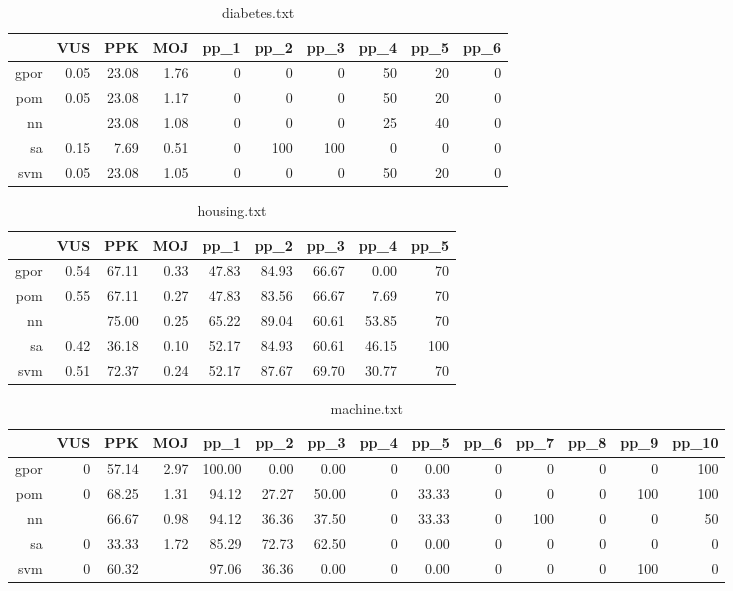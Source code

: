 \documentclass[10pt,a4paper]{article}
\begin{document}
\begin{table}[ht]
\centering
\begin{tabular}{rrrrrrrrrr}
  \hline
 & VUS & PPK & MOJ & pp\_1 & pp\_2 & pp\_3 & pp\_4 & pp\_5 & pp\_6 \\ 
  \hline
gpor & 0.05 & 23.08 & 1.76 &   0 &   0 &   0 &  50 &  20 &   0 \\ 
  pom & 0.05 & 23.08 & 1.17 &   0 &   0 &   0 &  50 &  20 &   0 \\ 
  nn &  & 23.08 & 1.08 &   0 &   0 &   0 &  25 &  40 &   0 \\ 
  sa & 0.15 & 7.69 & 0.51 &   0 & 100 & 100 &   0 &   0 &   0 \\ 
  svm & 0.05 & 23.08 & 1.05 &   0 &   0 &   0 &  50 &  20 &   0 \\ 
   \hline
\end{tabular}
\caption{diabetes.txt} 
\end{table}
\begin{table}[ht]
\centering
\begin{tabular}{rrrrrrrrr}
  \hline
 & VUS & PPK & MOJ & pp\_1 & pp\_2 & pp\_3 & pp\_4 & pp\_5 \\ 
  \hline
gpor & 0.54 & 67.11 & 0.33 & 47.83 & 84.93 & 66.67 & 0.00 &  70 \\ 
  pom & 0.55 & 67.11 & 0.27 & 47.83 & 83.56 & 66.67 & 7.69 &  70 \\ 
  nn &  & 75.00 & 0.25 & 65.22 & 89.04 & 60.61 & 53.85 &  70 \\ 
  sa & 0.42 & 36.18 & 0.10 & 52.17 & 84.93 & 60.61 & 46.15 & 100 \\ 
  svm & 0.51 & 72.37 & 0.24 & 52.17 & 87.67 & 69.70 & 30.77 &  70 \\ 
   \hline
\end{tabular}
\caption{housing.txt} 
\end{table}
\begin{table}[ht]
\centering
\begin{tabular}{rrrrrrrrrrrrrr}
  \hline
 & VUS & PPK & MOJ & pp\_1 & pp\_2 & pp\_3 & pp\_4 & pp\_5 & pp\_6 & pp\_7 & pp\_8 & pp\_9 & pp\_10 \\ 
  \hline
gpor &   0 & 57.14 & 2.97 & 100.00 & 0.00 & 0.00 &   0 & 0.00 &   0 &   0 &   0 &   0 & 100 \\ 
  pom &   0 & 68.25 & 1.31 & 94.12 & 27.27 & 50.00 &   0 & 33.33 &   0 &   0 &   0 & 100 & 100 \\ 
  nn &  & 66.67 & 0.98 & 94.12 & 36.36 & 37.50 &   0 & 33.33 &   0 & 100 &   0 &   0 &  50 \\ 
  sa &   0 & 33.33 & 1.72 & 85.29 & 72.73 & 62.50 &   0 & 0.00 &   0 &   0 &   0 &   0 &   0 \\ 
  svm &   0 & 60.32 &  & 97.06 & 36.36 & 0.00 &   0 & 0.00 &   0 &   0 &   0 & 100 &   0 \\ 
   \hline
\end{tabular}
\caption{machine.txt} 
\end{table}
\end{document}
